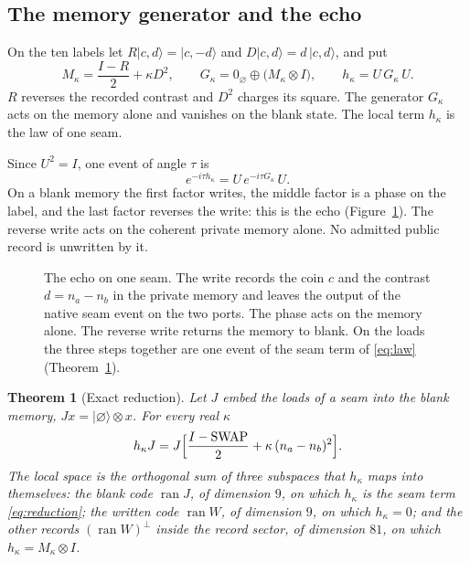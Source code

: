 \documentclass[11pt]{article}
\newtheorem{theorem}{Theorem}[section]
\theoremstyle{definition}
\theoremstyle{remark}
\theoremstyle{plain}
\newcommand{\ket}[1]{\lvert #1\rangle}
\newcommand{\ran}{\operatorname{ran}}
\newcommand{\SWAP}{\mathrm{SWAP}}
\newcommand{\blank}{\varnothing}
\begin{document}
\subsection{The memory generator and the echo}

On the ten labels let $R\ket{c,d}=\ket{c,-d}$ and $D\ket{c,d}=d\,\ket{c,d}$,
and put
\begin{equation}
M_\kappa=\frac{I-R}{2}+\kappa D^{2},\qquad
G_\kappa=0_{\blank}\oplus\bigl(M_\kappa\otimes I\bigr),\qquad
h_\kappa=U\,G_\kappa\,U .
\label{eq:generator}
\end{equation}
$R$ reverses the recorded contrast and $D^{2}$ charges its square. The
generator $G_\kappa$ acts on the memory alone and vanishes on the blank
state. The local term $h_\kappa$ is the law of one seam.

Since $U^{2}=I$, one event of angle $\tau$ is
\begin{equation}
e^{-i\tau h_\kappa}=U\,e^{-i\tau G_\kappa}\,U .
\label{eq:echo-event}
\end{equation}
On a blank memory the first factor writes, the middle factor is a phase on
the label, and the last factor reverses the write: this is the echo
(Figure~\ref{fig:echo}). The reverse write acts on the coherent private
memory alone. No admitted public record is unwritten by it.

\begin{figure}[!htb]
\centering

\caption{The echo on one seam. The write records the coin $c$ and the
contrast $d=n_a-n_b$ in the private memory and leaves the output of the
native seam event on the two ports. The phase acts on the memory alone.
The reverse write returns the memory to blank. On the loads the three steps
together are one event of the seam term of \eqref{eq:law}
(Theorem~\ref{thm:reduction}).}
\label{fig:echo}
\end{figure}

\begin{theorem}[Exact reduction]
\label{thm:reduction}
Let $J$ embed the loads of a seam into the blank memory,
$Jx=\ket{\blank}\otimes x$. For every real $\kappa$
\begin{equation}
h_\kappa J=J\Bigl[\frac{I-\SWAP}{2}+\kappa\,(n_a-n_b)^{2}\Bigr].
\label{eq:reduction}
\end{equation}
The local space is the orthogonal sum of three subspaces that $h_\kappa$
maps into themselves: the blank code $\ran J$, of dimension $9$, on which
$h_\kappa$ is the seam term \eqref{eq:reduction}; the written code $\ran W$,
of dimension $9$, on which $h_\kappa=0$; and the other records
$(\ran W)^{\perp}$ inside the record sector, of dimension $81$, on which
$h_\kappa=M_\kappa\otimes I$.
\end{theorem}
\end{document}
